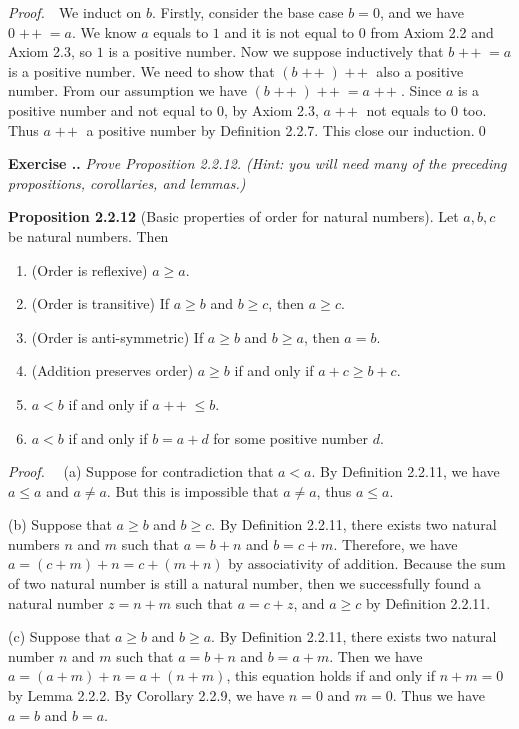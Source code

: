 \documentclass{book}
\DeclareMathOperator{\tadd}{+\!+}%
\newcommand{\pff}{\vspace{.25em}\noindent\emph{Proof.}~~}
\newcommand{\titl}[1]{\noindent\textbf{#1}}
\newcounter{Exercise}[section]
\renewcommand{\theExercise}{\thesection.\arabic{Exercise}.}
\newcommand{\new}{\vspace{1.5em}\noindent\textbf{{Exercise \stepcounter{Exercise}\textbf{\theExercise}}} }
\begin{document}
\pff We induct on $b$. Firstly, consider the base case $b = 0$, and we have $0\tadd = a$. We know $a$ equals to $1$ and it is not equal to $0$ from Axiom 2.2 and Axiom 2.3, so $1$ is a positive number. Now we suppose inductively that $b\tadd = a$ is a positive number. We need to show that $(b\tadd)\tadd$ also a positive number. From our assumption we have $(b\tadd)\tadd = a\tadd$. Since $a$ is a positive number and not equal to $0$, by Axiom 2.3, $a\tadd$ not equals to $0$ too. Thus $a\tadd$ a positive number by Definition 2.2.7. This close our induction.\qed

\new\emph{Prove Proposition 2.2.12. (Hint: you will need many of the preceding propositions, corollaries, and lemmas.)}

\begin{framed}
\titl{Proposition 2.2.12} (Basic properties of order for natural numbers). Let $a, b, c$ be natural numbers. Then
\begin{enumerate}
    \item (Order is reflexive) $a \geq a$.
    \item (Order is transitive) If $a \geq b$ and $b \geq c$, then $a \geq c$.
    \item (Order is anti-symmetric) If $a \geq b$ and $b \geq a$, then $a = b$.
    \item (Addition preserves order) $a \geq b$ if and only if $a + c \geq b + c$.
    \item $a < b$ if and only if $a\tadd \leq b$.
    \item $a < b$ if and only if $b = a + d$ for some positive number $d$.
\end{enumerate}
\end{framed}

\pff 
(a) Suppose for contradiction that $a < a$. By Definition 2.2.11, we have $a \leq a$ and $a \neq a$. But this is impossible that $a \neq a$, thus $a \leq a$.

(b) Suppose that $a \geq b$ and $b \geq c$. By Definition 2.2.11, there exists two natural numbers $n$ and $m$ such that $a = b + n$ and $b = c + m$. Therefore, we have $a = (c + m) + n = c + (m + n)$ by associativity of addition. Because the sum of two natural number is still a natural number, then we successfully found a natural number $z = n + m$ such that $a = c + z$, and $a \geq c$ by Definition 2.2.11.

(c) Suppose that $a \geq b$ and $b \geq a$. By Definition 2.2.11, there exists two natural number $n$ and $m$ such that $a = b + n$ and $b = a + m$. Then we have $a = (a + m) + n = a + (n + m)$, this equation holds if and only if $n + m = 0$ by Lemma 2.2.2. By Corollary 2.2.9, we have $n = 0$ and $m = 0$. Thus we have $a = b$ and $b = a$.
\end{document}
